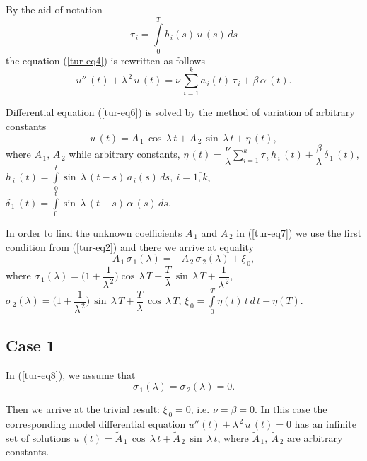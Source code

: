 ﻿\documentclass[
11pt,%
tightenlines,%
twoside,%
onecolumn,%
nofloats,%
nobibnotes,%
nofootinbib,%
superscriptaddress,%
noshowpacs,%
centertags]%
{revtex4}
\begin{document}
	By the aid of notation  
\begin{equation} \label{tur-eq5}
\tau_{\, i}=\int \limits_{0}^T  b_{\, i} (s) \, u \, (s) \, d s 
\end{equation}
the equation (\ref{tur-eq4}) is rewritten as follows 
\begin{equation} \label{tur-eq6}
u'' \, (t)+\lambda^{\, 2} \, u \, (t)=\nu \, \sum \limits_{i=1}^{k} a_{\, i} (t) \, \tau_{\, i}+\beta \, \alpha \, (t) .
\end{equation}

Differential equation (\ref{tur-eq6}) is solved by the method of variation of arbitrary constants
\begin{equation} \label{tur-eq7}	
u \, (t)=A_{\, 1} \, \cos \, \lambda \, t+A_{\, 2} \, \sin \, \lambda \, t+\eta \, (t) ,
\end{equation}
where $A_{\, 1} , \, A_{\, 2}$ while arbitrary constants,
$\eta \, (t)=\dfrac{\nu}{\lambda} \sum \limits_{i=1}^{k}  \tau_{\, i} \, h_{\, i} \, (t)+\dfrac{\beta}{\lambda} \, \delta_{\, 1} \, (t) $,
$h_{\, i} \, (t)= \int \limits_{0}^t \sin  \, \lambda \, (t-s) \, a_{\, i} (s) \, d s , \: i=\overline{1 , k} $,  $ \delta_{\, 1} \, (t)= \int \limits_{0}^t \sin  \, \lambda \, (t-s) \, \alpha \, (s) \, d s$.

	In order to find the unknown coefficients $A_{\, 1} $  and $A_{\, 2} $ in (\ref{tur-eq7}) we use the first condition from (\ref{tur-eq2}) and there we arrive at equality 
\begin{equation} \label{tur-eq8}
A_{\, 1} \, \sigma_{\, 1} (\lambda)=-A_{\, 2} \, \sigma_{\, 2} (\lambda)+\xi_{\, 0} ,
\end{equation}
where $\sigma_{\, 1} (\lambda)=\Big(1+\dfrac{1}{\lambda^{\, 2}} \Big) \cos \, \lambda \, T- \dfrac{T}{\lambda} \, \sin \, \lambda \, T+\dfrac{1}{\lambda^{\, 2}}$,
$\sigma_{\, 2} (\lambda)=\Big(1+\dfrac{1}{\lambda^{\, 2}} \Big) \, \sin \, \lambda \, T+\dfrac{T}{\lambda} \, \cos \, \lambda \, T$, 
$\xi_{\, 0}=\int \limits_{0}^T \eta (t) \, t \, d \, t-\eta (T)$.

\subsection{Case 1}

In (\ref{tur-eq8}), we assume that 
\begin{equation} \label{tur-eq9}
\sigma_{\, 1} (\lambda)=\sigma_{\, 2} (\lambda)=0 .
\end{equation}

Then we arrive at the trivial result: $\xi_{\, 0}=0$, i.e. $\nu=\beta=0$. In this case the corresponding model differential equation $u'' (t)+\lambda^{\, 2} \, u \, (t)=0$ has an infinite set of solutions $
u \, (t)=\tilde A_{\, 1} \, \cos \, \lambda \, t+\tilde A_{\, 2} \, \sin \, \lambda \, t$, 
where $\tilde A_{\, 1}, \: \tilde A_{\, 2}$ are arbitrary constants. 
\end{document}
